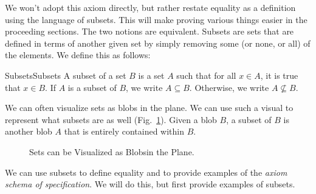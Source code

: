             We won't adopt this axiom directly, but rather restate equality
            as a definition using the language of subsets. This will make
            proving various things easier in the proceeding sections. The
            two notions are equivalent.
            Subsets are sets that are defined in terms of another given set
            by simply removing some (or none, or all) of the elements.
            We define this as follows:
            \begin{fdefinition}{Subsets}{Subsets}
                A subset of a set $B$ is a set $A$ such that for all
                $x\in{A}$, it is true that $x\in{B}$. If $A$ is a subset
                of $B$, we write $A\subseteq{B}$. Otherwise, we write
                $A\nsubseteq{B}$.
            \end{fdefinition}
            We can often visualize sets as blobs in the plane. We can use
            such a visual to represent what subsets are as well
            (Fig.~\ref{fig:Subset_Blobs}). Given a blob $B$, a subset of
            $B$ is another blob $A$ that is entirely contained within $B$.
            \begin{figure}[H]
                \centering
                
                \caption[Visual for Subsets]
                        {Sets can be Visualized as Blobsin the Plane.}
                \label{fig:Subset_Blobs}
            \end{figure}
            We can use subsets to define equality and to provide examples
            of the \textit{axiom schema of specification}. We will do this,
            but first provide examples of subsets.
